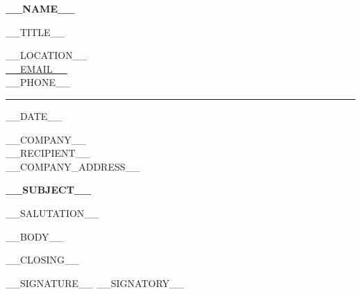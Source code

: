 \documentclass[11pt,a4paper]{article}
\begin{document}
\begin{minipage}{\textwidth}
{\fontsize{25}{27}\selectfont\bfseries\color{mainblue} __NAME__}\par
\vspace{0.08cm}
{\large\color{black!68} __TITLE__}\par
\vspace{0.65cm}
__LOCATION__\\
\href{mailto:__EMAIL__}{\color{mainblue}__EMAIL__}\\
__PHONE__

\vspace{0.75cm}
\textcolor{black!28}{\rule{\textwidth}{0.6pt}}

\vspace{0.25cm}
\hfill __DATE__

\vspace{0.25cm}
__COMPANY__\\
__RECIPIENT__\\
__COMPANY_ADDRESS__

\vspace{0.65cm}
{\large\bfseries\color{mainblue} __SUBJECT__}

\vspace{0.30cm}
__SALUTATION__

\begin{justify}
__BODY__
\end{justify}

\vspace{0.30cm}
__CLOSING__

__SIGNATURE__
__SIGNATORY__
\end{minipage}
\end{document}
